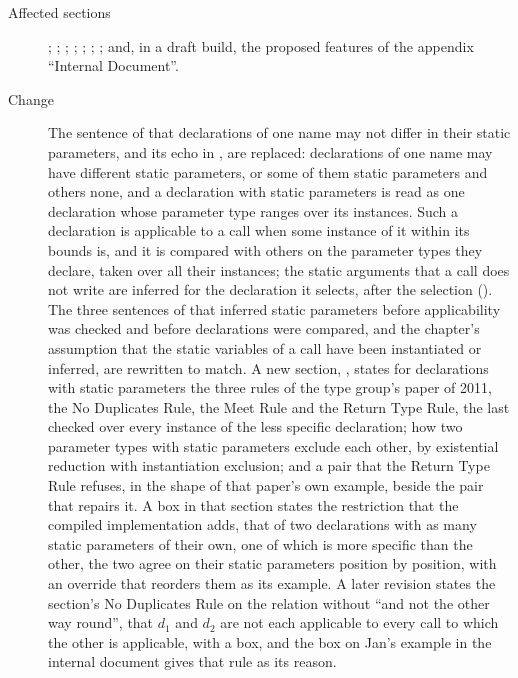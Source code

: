 \begin{description}
\item[Affected sections] ;
; ;
; ;
; ; and, in a
draft build, the proposed features of the appendix ``Internal Document''.
\item[Change] The sentence of  that declarations of
one name may not differ in their static parameters, and its echo in
, are replaced: declarations of one name may have
different static parameters, or some of them static parameters and others none,
and a declaration with static parameters is read as one declaration whose
parameter type ranges over its instances.
Such a declaration is applicable to a call when some instance of it within its
bounds is, and it is compared with others on the parameter types they declare,
taken over all their instances; the static arguments that a call does not write
are inferred for the declaration it selects, after the selection
().
The three sentences of  that inferred static
parameters before applicability was checked and before declarations were
compared, and the chapter's assumption that the static variables of a call have
been instantiated or inferred, are rewritten to match.
A new section, , states for declarations with
static parameters the three rules of the type group's paper of 2011, the No
Duplicates Rule, the Meet Rule and the Return Type Rule, the last checked over
every instance of the less specific declaration; how two parameter types with
static parameters exclude each other, by existential reduction with
instantiation exclusion; and a pair that the Return Type Rule refuses, in the
shape of that paper's own example, beside the pair that repairs it.
A box in that section states the restriction that the compiled implementation
adds, that of two declarations with as many static parameters of their own, one
of which is more specific than the other, the two agree on their static
parameters position by position, with an override that reorders them as its
example.
A later revision states the section's No Duplicates Rule on the relation without
``and not the other way round'', that $d_1$ and $d_2$ are not each applicable to
every call to which the other is applicable, with a box, and the box on Jan's
example in the internal document gives that rule as its reason.

\end{description}
